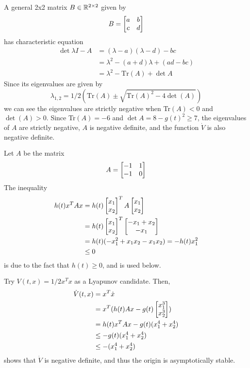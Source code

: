 \documentclass{homework}
\begin{document}
\begin{letterenum}
A general 2x2 matrix $B\in\mathbb{R}^{2\times 2}$ given by
\begin{equation*}
    B = \begin{bmatrix} 
        a & b \\
        c & d
     \end{bmatrix}
\end{equation*}
has characteristic equation
\begin{align*}
    \det{\lambda I - A} &= (\lambda - a) (\lambda - d) - bc \\
        &= \lambda^2 - (a + d) \lambda + (ad - bc) \\
        &= \lambda^2 -\text{Tr}(A) + \det{A}
\end{align*}
Since its eigenvalues are given by
\begin{equation*}
    \lambda_{1,2} = 1/2(\text{Tr}(A) \pm \sqrt{\text{Tr}(A)^2 - 4 \det(A)})
\end{equation*}
we can see the eigenvalues are strictly negative when Tr$(A) < 0$ and $\det(A) > 0$.
Since Tr$(A) = -6$ and $\det{A} = 8 - g(t)^2 \geq 7$, the eigenvalues of $A$
are strictly negative, $A$ is negative definite, and the function $\dot{V}$ is also
negative definite.

\item Let $A$ be the matrix
\begin{equation*}
    A = \begin{bmatrix} -1 & 1 \\ -1 & 0  \end{bmatrix}
\end{equation*}
The inequality
\begin{align*}
    h(t) x^T A x &=
        h(t) \begin{bmatrix} x_1 \\ x_2 \end{bmatrix}^T A \begin{bmatrix} x_1 \\ x_2 \end{bmatrix} \\
        &= h(t) \begin{bmatrix} x_1 \\ x_2 \end{bmatrix}^T \begin{bmatrix} -x_1 + x_2 \\ -x_1 \end{bmatrix} \\
        &= h(t) (-x_1^2 + x_1 x_2 - x_1 x_2) = -h(t) x_1^2 \\
        &\leq 0
\end{align*}
is due to the fact that $h(t) \geq 0$, and is used below.

Try $V(t, x) = 1/2 x^T x$ as a Lyapunov candidate. Then,
\begin{align*}
    \dot{V}(t, x) &= x^T \dot{x} \\
        &= x^T (h(t) Ax - g(t) \begin{bmatrix} x_1^3 \\ x_2^3 \end{bmatrix}) \\
        &= h(t) x^T A x - g(t) (x_1^4 + x_2^4) \\
        &\leq -g(t) (x_1^4 + x_2^4) \\
        &\leq -(x_1^4 + x_2^4) \\
\end{align*}
shows that $\dot{V}$ is negative definite, and thus the origin is
asymptotically stable.

\end{letterenum}
\end{document}
